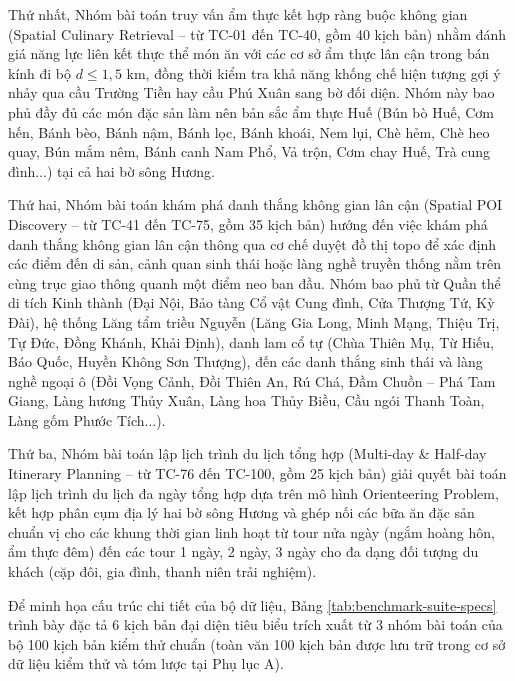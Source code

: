 Thứ nhất, Nhóm bài toán truy vấn ẩm thực kết hợp ràng buộc không gian (Spatial Culinary Retrieval -- từ TC-01 đến TC-40, gồm 40 kịch bản) nhằm đánh giá năng lực liên kết thực thể món ăn với các cơ sở ẩm thực lân cận trong bán kính đi bộ $d \le 1{,}5\text{ km}$, đồng thời kiểm tra khả năng khống chế hiện tượng gợi ý nhảy qua cầu Trường Tiền hay cầu Phú Xuân sang bờ đối diện. Nhóm này bao phủ đầy đủ các món đặc sản làm nên bản sắc ẩm thực Huế (Bún bò Huế, Cơm hến, Bánh bèo, Bánh nậm, Bánh lọc, Bánh khoái, Nem lụi, Chè hẻm, Chè heo quay, Bún mắm nêm, Bánh canh Nam Phổ, Vả trộn, Cơm chay Huế, Trà cung đình...) tại cả hai bờ sông Hương.

Thứ hai, Nhóm bài toán khám phá danh thắng không gian lân cận (Spatial POI Discovery -- từ TC-41 đến TC-75, gồm 35 kịch bản) hướng đến việc khám phá danh thắng không gian lân cận thông qua cơ chế duyệt đồ thị topo để xác định các điểm đến di sản, cảnh quan sinh thái hoặc làng nghề truyền thống nằm trên cùng trục giao thông quanh một điểm neo ban đầu. Nhóm bao phủ từ Quần thể di tích Kinh thành (Đại Nội, Bảo tàng Cổ vật Cung đình, Cửa Thượng Tứ, Kỳ Đài), hệ thống Lăng tẩm triều Nguyễn (Lăng Gia Long, Minh Mạng, Thiệu Trị, Tự Đức, Đồng Khánh, Khải Định), danh lam cổ tự (Chùa Thiên Mụ, Từ Hiếu, Báo Quốc, Huyền Không Sơn Thượng), đến các danh thắng sinh thái và làng nghề ngoại ô (Đồi Vọng Cảnh, Đồi Thiên An, Rú Chá, Đầm Chuồn -- Phá Tam Giang, Làng hương Thủy Xuân, Làng hoa Thủy Biều, Cầu ngói Thanh Toàn, Làng gốm Phước Tích...).

Thứ ba, Nhóm bài toán lập lịch trình du lịch tổng hợp (Multi-day \& Half-day Itinerary Planning -- từ TC-76 đến TC-100, gồm 25 kịch bản) giải quyết bài toán lập lịch trình du lịch đa ngày tổng hợp dựa trên mô hình Orienteering Problem, kết hợp phân cụm địa lý hai bờ sông Hương và ghép nối các bữa ăn đặc sản chuẩn vị cho các khung thời gian linh hoạt từ tour nửa ngày (ngắm hoàng hôn, ẩm thực đêm) đến các tour 1 ngày, 2 ngày, 3 ngày cho đa dạng đối tượng du khách (cặp đôi, gia đình, thanh niên trải nghiệm).

Để minh họa cấu trúc chi tiết của bộ dữ liệu, Bảng \ref{tab:benchmark-suite-specs} trình bày đặc tả 6 kịch bản đại diện tiêu biểu trích xuất từ 3 nhóm bài toán của bộ 100 kịch bản kiểm thử chuẩn (toàn văn 100 kịch bản được lưu trữ trong cơ sở dữ liệu kiểm thử và tóm lược tại Phụ lục A).

